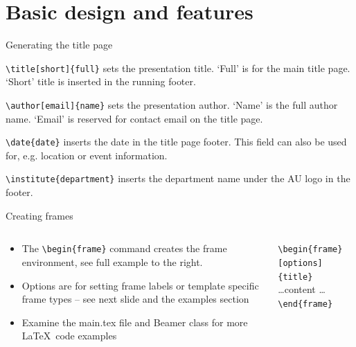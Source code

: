 \documentclass[aspectratio=169]{beamer}
\begin{document}
\section{Basic design and features}
\begin{frame}[fragile]{Generating the title page}%
\begin{description}[Institution]
\item[Title] \verb=\title[short]{full}= sets the presentation title. `Full' is for the main title page. `Short' title is inserted in the running footer. 
\item[Author] \verb=\author[email]{name}= sets the presentation author. `Name' is the full author name. `Email' is reserved for contact email on the title page.
\item[Date] \verb=\date{date}= inserts the date in the title page footer. This field can also be used for, e.g. location or event information.
\item[Institution] \verb=\institute{department}= inserts the department name under the AU logo in the footer.
\end{description}
\end{frame}

\begin{frame}[fragile]{Creating frames}%
\begin{columns}
\begin{column}{0.5\textwidth}
   \begin{itemize}
        \item The \verb=\begin{frame}= command creates the frame environment, see full example to the right.
       \item Options are for setting frame labels or template specific frame types -- see next slide and the examples section 
       \item Examine the main.tex file and Beamer class for more \LaTeX\ code examples
    \end{itemize}
\end{column}
\begin{column}{0.45\textwidth}  %
    \verb=\begin{frame}[options]{title}=\\
        \hspace{1em}\dots content \dots\\
    \verb=\end{frame}=
\end{column}
\end{columns}
\end{frame}
\end{document}
